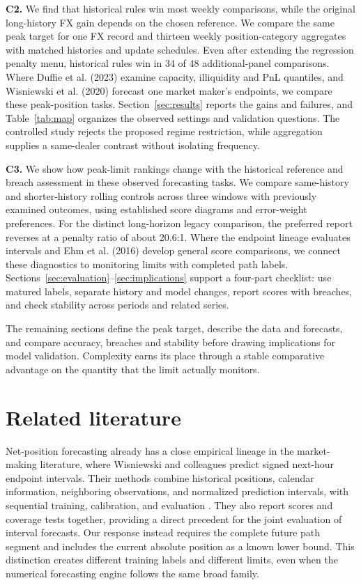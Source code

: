 \documentclass[11pt,a4paper]{article}
\begin{document}
\textbf{C2.} We find that historical rules win most weekly comparisons, while the original long-history FX gain depends on the chosen reference. We compare the same peak target for one FX record and thirteen weekly position-category aggregates with matched histories and update schedules. Even after extending the regression penalty menu, historical rules win in 34 of 48 additional-panel comparisons. Where Duffie et al. (2023) examine capacity, illiquidity and PnL quantiles, and Wisniewski et al. (2020) forecast one market maker's endpoints, we compare these peak-position tasks. Section~\ref{sec:results} reports the gains and failures, and Table~\ref{tab:map} organizes the observed settings and validation questions. The controlled study rejects the proposed regime restriction, while aggregation supplies a same-dealer contrast without isolating frequency.

\textbf{C3.} We show how peak-limit rankings change with the historical reference and breach assessment in these observed forecasting tasks. We compare same-history and shorter-history rolling controls across three windows with previously examined outcomes, using established score diagrams and error-weight preferences. For the distinct long-horizon legacy comparison, the preferred report reverses at a penalty ratio of about 20.6:1. Where the endpoint lineage evaluates intervals and Ehm et al. (2016) develop general score comparisons, we connect these diagnostics to monitoring limits with completed path labels. Sections~\ref{sec:evaluation}--\ref{sec:implications} support a four-part checklist: use matured labels, separate history and model changes, report scores with breaches, and check stability across periods and related series.


The remaining sections define the peak target, describe the data and forecasts, and compare accuracy, breaches and stability before drawing implications for model validation. Complexity earns its place through a stable comparative advantage on the quantity that the limit actually monitors.


\FloatBarrier

\section{Related literature}\label{sec:literature}

Net-position forecasting already has a close empirical lineage in the market-making literature, where Wisniewski and colleagues predict signed next-hour endpoint intervals. Their methods combine historical positions, calendar information, neighboring observations, and normalized prediction intervals, with sequential training, calibration, and evaluation \citep{wisniewski2020,wisniewski2024}. They also report scores and coverage tests together, providing a direct precedent for the joint evaluation of interval forecasts. Our response instead requires the complete future path segment and includes the current absolute position as a known lower bound. This distinction creates different training labels and different limits, even when the numerical forecasting engine follows the same broad family.
\end{document}
